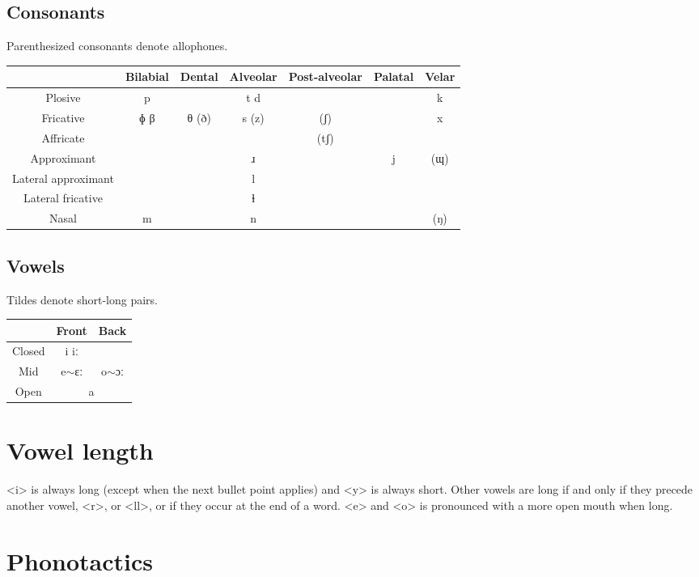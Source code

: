 \documentclass{book}
\begin{document}
\subsection{Consonants}
Parenthesized consonants denote allophones.
\begin{center}
	\begin{tabular}{|c|c|c|c|c|c|c|}
		\hline
		& Bilabial & Dental & Alveolar & Post-alveolar & Palatal & Velar \\ \hline
		Plosive & p & & t d & & & k \\ \hline
		Fricative & ɸ β & θ (ð) & s (z) & (ʃ) & & x \\ \hline
		Affricate & & & & (tʃ) & & \\ \hline
		Approximant & & & ɹ & & j & (ɰ) \\ \hline
		Lateral approximant & & & l & & & \\ \hline
		Lateral fricative & & & ɬ & & & \\ \hline
		Nasal & m & & n & & & (ŋ) \\ \hline
	\end{tabular}
\end{center}
\subsection{Vowels}
Tildes denote short-long pairs.
\begin{center}
	\begin{tabular}{|c|c|c|}
		\hline
		& Front & Back \\ \hline
		Closed & i iː & \\ \hline
		Mid & e$\sim$ɛː & o$\sim$ɔː \\ \hline
		Open & \multicolumn{2}{c|}{a} \\ \hline
	\end{tabular}
\end{center}

\section{Vowel length}

<i> is always long (except when the next bullet point applies) and <y> is always short. Other vowels are long if and only if they precede another vowel, <r>, or <ll>, or if they occur at the end of a word. <e> and <o> is pronounced with a more open mouth when long.

\section{Phonotactics}
\end{document}
